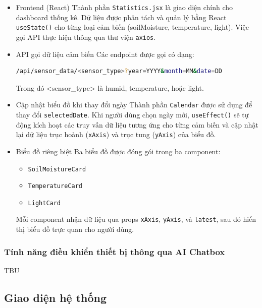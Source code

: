 \begin{itemize}
    \item Frontend (React) \newline
    Thành phần \texttt{Statistics.jsx} là giao diện chính cho dashboard thống kê. Dữ liệu được phân tách và quản lý bằng React \texttt{useState()} cho từng loại cảm biến (soilMoisture, temperature, light). Việc gọi API thực hiện thông qua thư viện \texttt{axios}.

    \item API gọi dữ liệu cảm biến \newline
    Các endpoint được gọi có dạng:
    \begin{lstlisting}[language=bash]
/api/sensor_data/<sensor_type>?year=YYYY&month=MM&date=DD
    \end{lstlisting}
    Trong đó <sensor\_type> là humid, temperature, hoặc light.

    \item Cập nhật biểu đồ khi thay đổi ngày \newline
    Thành phần \texttt{Calendar} được sử dụng để thay đổi \texttt{selectedDate}. Khi người dùng chọn ngày mới, \texttt{useEffect()} sẽ tự động kích hoạt các truy vấn dữ liệu tương ứng cho từng cảm biến và cập nhật lại dữ liệu trục hoành (\texttt{xAxis}) và trục tung (\texttt{yAxis}) của biểu đồ.
    \item Biểu đồ riêng biệt
    Ba biểu đồ được đóng gói trong ba component:
    \begin{itemize}
        \item \texttt{SoilMoistureCard}
        \item \texttt{TemperatureCard}
        \item \texttt{LightCard}
    \end{itemize}
    Mỗi component nhận dữ liệu qua props \texttt{xAxis}, \texttt{yAxis}, và \texttt{latest}, sau đó hiển thị biểu đồ trực quan cho người dùng.
\end{itemize}
    
\subsubsection{Tính năng điều khiển thiết bị thông qua AI Chatbox}

TBU

\subsection{Giao diện hệ thống}

